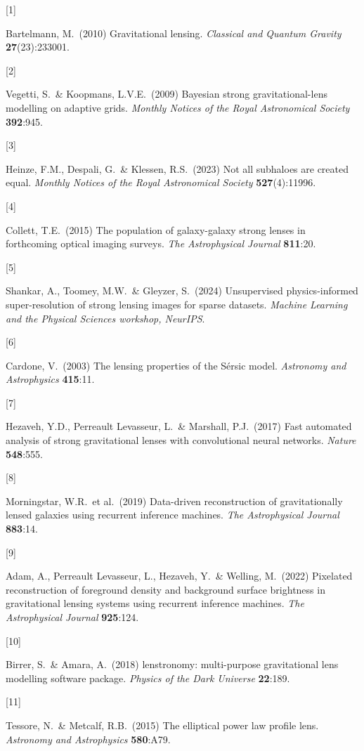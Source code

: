 \documentclass{article}
\begin{document}
{
\small

\hypertarget{ref1}{[1]} Bartelmann, M.\ (2010) Gravitational lensing. {\it Classical and Quantum
Gravity} {\bf 27}(23):233001.

\hypertarget{ref2}{[2]} Vegetti, S.\ \& Koopmans, L.V.E.\ (2009) Bayesian strong gravitational-lens
modelling on adaptive grids. {\it Monthly Notices of the Royal Astronomical
Society} {\bf 392}:945.

\hypertarget{ref3}{[3]} Heinze, F.M., Despali, G.\ \& Klessen, R.S.\ (2023) Not all subhaloes are
created equal. {\it Monthly Notices of the Royal Astronomical Society}
{\bf 527}(4):11996.

\hypertarget{ref4}{[4]} Collett, T.E.\ (2015) The population of galaxy-galaxy strong lenses in
forthcoming optical imaging surveys. {\it The Astrophysical Journal}
{\bf 811}:20.

\hypertarget{ref5}{[5]} Shankar, A., Toomey, M.W.\ \& Gleyzer, S.\ (2024) Unsupervised
physics-informed super-resolution of strong lensing images for sparse datasets.
{\it Machine Learning and the Physical Sciences workshop, NeurIPS}.

\hypertarget{ref6}{[6]} Cardone, V.\ (2003) The lensing properties of the S\'ersic model.
{\it Astronomy and Astrophysics} {\bf 415}:11.

\hypertarget{ref7}{[7]} Hezaveh, Y.D., Perreault Levasseur, L.\ \& Marshall, P.J.\ (2017) Fast
automated analysis of strong gravitational lenses with convolutional neural
networks. {\it Nature} {\bf 548}:555.

\hypertarget{ref8}{[8]} Morningstar, W.R.\ et al.\ (2019) Data-driven reconstruction of
gravitationally lensed galaxies using recurrent inference machines.
{\it The Astrophysical Journal} {\bf 883}:14.

\hypertarget{ref9}{[9]} Adam, A., Perreault Levasseur, L., Hezaveh, Y.\ \& Welling, M.\ (2022)
Pixelated reconstruction of foreground density and background surface brightness
in gravitational lensing systems using recurrent inference machines.
{\it The Astrophysical Journal} {\bf 925}:124.

\hypertarget{ref10}{[10]} Birrer, S.\ \& Amara, A.\ (2018) lenstronomy: multi-purpose gravitational
lens modelling software package. {\it Physics of the Dark Universe}
{\bf 22}:189.

\hypertarget{ref11}{[11]} Tessore, N.\ \& Metcalf, R.B.\ (2015) The elliptical power law profile
lens. {\it Astronomy and Astrophysics} {\bf 580}:A79.

}
\end{document}
